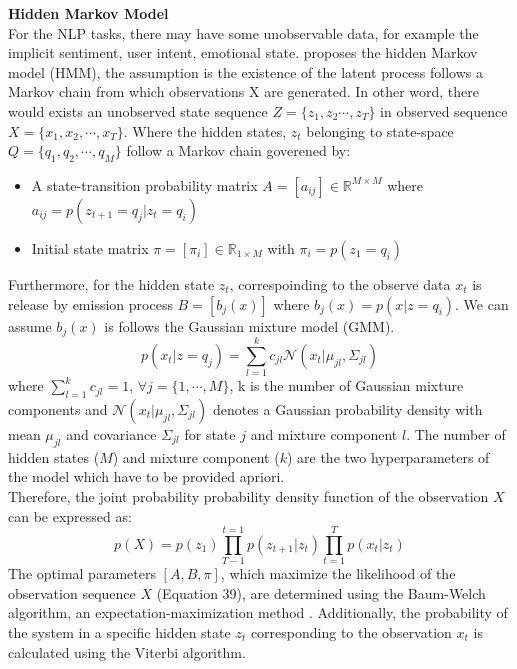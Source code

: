 \documentclass[12pt,a4paper]{article}
\begin{document}
\newpage
\textbf{Hidden Markov Model}
\\[1ex]
For the NLP tasks, there may have some unobservable data, for example the implicit sentiment, user intent, emotional state. \parencite{rabiner1993fundamentals} proposes the hidden Markov model (HMM), the assumption is the existence of the latent process follows a Markov chain from which observations X are generated. In other word, there would exists an unobserved state sequence $Z = \{z_1, z_2 \cdots , z_T\}$ in observed sequence $X = \{x_1, x_2, \cdots, x_T\}$. Where the hidden states, $z_t$ belonging to state-space $Q = \{q_1, q_2, \cdots, q_M \}$ follow a Markov chain goverened by: 
\begin{itemize}
    \item A state-transition probability matrix $A = [a_{ij}] \in \mathbb{R}^{M \times M}$ where $a_{ij} = p(z_{t+1} = q_j | z_t = q_i)$ 
\end{itemize}
\begin{itemize}
    \item Initial state matrix $\pi = [\pi_i] \in \mathbb{R}_{1 \times M}$ with $\pi_i = p(z_1 = q_i)$
\end{itemize}
Furthermore, for the hidden state $z_t$, correspoinding to the observe data $x_t$ is release by emission process $B = [b_j(x)]$ where $b_j(x) = p(x|z=q_i)$. We can assume $b_j(x)$ is follows the Gaussian mixture model (GMM).
\begin{equation}
    p(x_t|z=q_j) = \sum_{l=1}^{k}c_{jl}\mathcal{N}(x_t|\mu_{jl}, \Sigma_{jl})
\end{equation}
where $\sum_{l=1}^{k}c_{jl} = 1$, $\forall j = \{1,\cdots, M\}$, k is the number of Gaussian mixture components and $\mathcal{N}(x_t|\mu_{jl}, \Sigma_{jl})$ denotes a Gaussian probability density with mean $\mu_{jl}$ and covariance $\Sigma_{jl}$ for state $j$ and mixture component $l$. The number of hidden states ($M$) and mixture component ($k$) are the two hyperparameters of the model which have to be provided apriori.
\\[1ex]
Therefore, the joint probability probability density function of the observation $X$ can be expressed as:
\begin{equation}
    p(X) = p(z_1) \prod^{t=1}_{T-1} p(z_{t+1}|z_{t}) \prod_{t=1}^{T} p(x_t|z_t)
\end{equation}
The optimal parameters $[A, B, \pi]$, which maximize the likelihood of the observation sequence $X$ (Equation 39), are determined using the Baum-Welch algorithm, an expectation-maximization method \parencite{rabiner1993fundamentals}. Additionally, the probability of the system in a specific hidden state $z_t$ corresponding to the observation $x_t$ is calculated using the Viterbi algorithm.
\newpage
\end{document}
